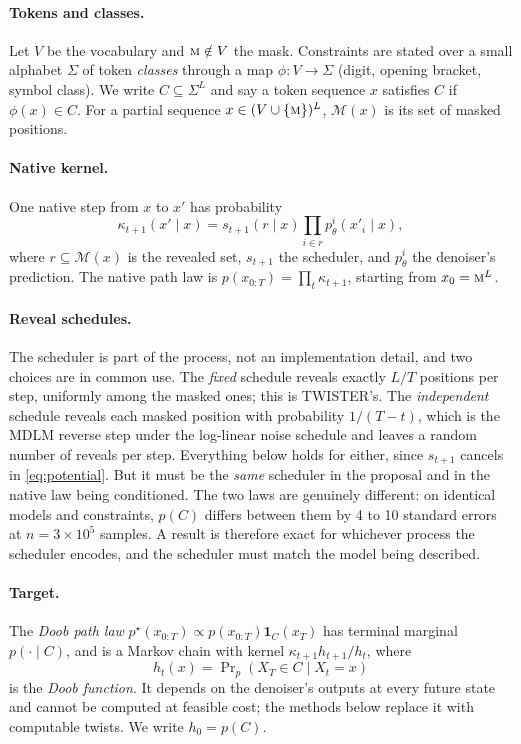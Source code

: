 \documentclass[11pt]{article}
\theoremstyle{definition}
\newcommand{\M}{\mathcal{M}}
\newcommand{\one}{\mathbf{1}}
\newcommand{\mask}{\textsc{m}}
\begin{document}
\paragraph{Tokens and classes.}
Let $V$ be the vocabulary and $\mask\notin V$ the mask. Constraints are stated over a small alphabet $\Sigma$ of
token \emph{classes} through a map $\phi:V\to\Sigma$ (digit, opening bracket, symbol class). We write $C\subseteq\Sigma^L$
and say a token sequence $x$ satisfies $C$ if $\phi(x)\in C$. For a partial sequence $x\in(V\cup\{\mask\})^L$,
$\M(x)$ is its set of masked positions.

\paragraph{Native kernel.}
One native step from $x$ to $x'$ has probability
\begin{equation}\label{eq:native}
  \kappa_{t+1}(x'\mid x)=s_{t+1}(r\mid x)\prod_{i\in r}p^i_\theta(x'_i\mid x),
\end{equation}
where $r\subseteq\M(x)$ is the revealed set, $s_{t+1}$ the scheduler, and $p^i_\theta$ the denoiser's prediction.
The native path law is $p(x_{0:T})=\prod_t\kappa_{t+1}$, starting from $x_0=\mask^L$.

\paragraph{Reveal schedules.}
The scheduler is part of the process, not an implementation detail, and two choices are in common use. The
\emph{fixed} schedule reveals exactly $L/T$ positions per step, uniformly among the masked ones; this is
TWISTER's. The \emph{independent} schedule reveals each masked position with probability $1/(T-t)$, which is the
MDLM reverse step \cite{sahoo2024} under the log-linear noise schedule and leaves a random number of reveals per
step. Everything below holds for either, since $s_{t+1}$ cancels in \eqref{eq:potential}. But it must be the
\emph{same} scheduler in the proposal and in the native law being conditioned. The two laws are genuinely
different: on identical models and constraints, $p(C)$ differs between them by 4 to 10 standard errors at
$n=3\times10^5$ samples. A result is therefore exact for whichever process the scheduler encodes, and the
scheduler must match the model being described.

\paragraph{Target.}
The \emph{Doob path law} $p^\star(x_{0:T})\propto p(x_{0:T})\one_C(x_T)$ has terminal marginal $p(\cdot\mid C)$,
and is a Markov chain with kernel $\kappa_{t+1}h_{t+1}/h_t$, where
\[
  h_t(x)=\Pr\nolimits_p(X_T\in C\mid X_t=x)
\]
is the \emph{Doob function}. It depends on the denoiser's outputs at every future state and cannot be computed at
feasible cost; the methods below replace it with computable twists. We write $h_0=p(C)$.
\end{document}
